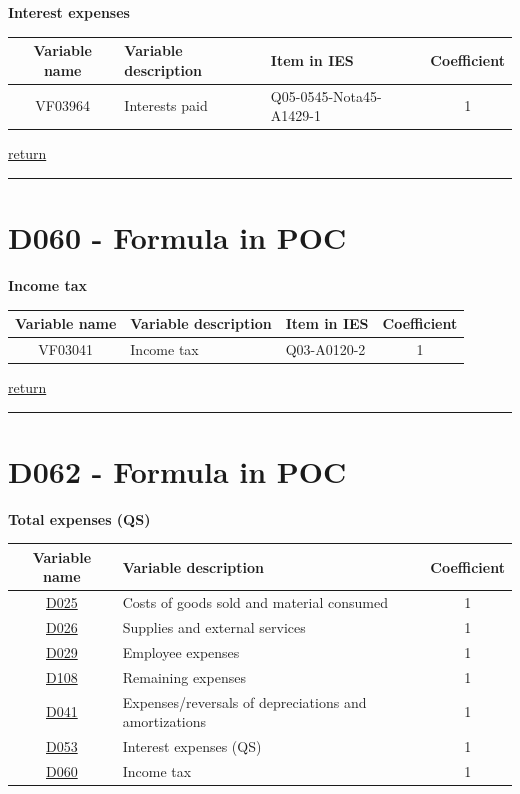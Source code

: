 \documentclass[]{book}
\begin{document}
\textbf{Interest expenses}

\begin{longtable}[]{@{}cllc@{}}
\toprule
Variable name & Variable description & Item in IES & Coefficient\tabularnewline
\midrule
\endhead
VF03964 & Interests paid & Q05-0545-Nota45-A1429-1 & 1\tabularnewline
\bottomrule
\end{longtable}

\protect\hyperlink{b3.-profit-and-loss-statement-variables}{return}

\begin{center}\rule{0.5\linewidth}{\linethickness}\end{center}

\hypertarget{d060---formula-in-poc}{%
\section{D060 - Formula in POC}\label{d060---formula-in-poc}}

\textbf{Income tax}

\begin{longtable}[]{@{}cllc@{}}
\toprule
Variable name & Variable description & Item in IES & Coefficient\tabularnewline
\midrule
\endhead
VF03041 & Income tax & Q03-A0120-2 & 1\tabularnewline
\bottomrule
\end{longtable}

\protect\hyperlink{b3.-profit-and-loss-statement-variables}{return}

\begin{center}\rule{0.5\linewidth}{\linethickness}\end{center}

\hypertarget{d062---formula-in-poc}{%
\section{D062 - Formula in POC}\label{d062---formula-in-poc}}

\textbf{Total expenses (QS)}

\begin{longtable}[]{@{}clc@{}}
\toprule
Variable name & Variable description & Coefficient\tabularnewline
\midrule
\endhead
\protect\hyperlink{d025---formula-in-poc}{D025} & Costs of goods sold and material consumed & 1\tabularnewline
\protect\hyperlink{d026---formula-in-poc}{D026} & Supplies and external services & 1\tabularnewline
\protect\hyperlink{d029---formula-in-poc}{D029} & Employee expenses & 1\tabularnewline
\protect\hyperlink{d108---formula-in-poc}{D108} & Remaining expenses & 1\tabularnewline
\protect\hyperlink{d041---formula-in-poc}{D041} & Expenses/reversals of depreciations and amortizations & 1\tabularnewline
\protect\hyperlink{d053---formula-in-poc}{D053} & Interest expenses (QS) & 1\tabularnewline
\protect\hyperlink{d060---formula-in-poc}{D060} & Income tax & 1\tabularnewline
\bottomrule
\end{longtable}
\end{document}
